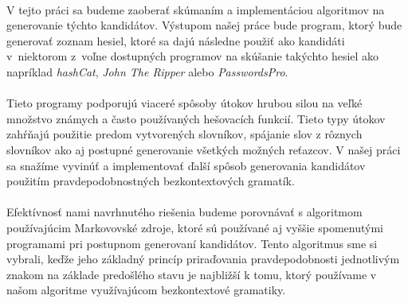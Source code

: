 \paragraph{}
V tejto práci sa budeme zaoberať skúmaním a implementáciou algoritmov na generovanie týchto kandidátov. Výstupom našej práce bude program, ktorý bude generovať zoznam hesiel, ktoré sa dajú následne použiť ako kandidáti v~niektorom z~voľne dostupných programov na skúšanie takýchto hesiel ako napríklad \emph{hashCat}, \emph{John The Ripper} alebo \emph{PasswordsPro}.

\paragraph{}
Tieto programy podporujú viaceré spôsoby útokov hrubou silou na veľké množstvo známych a často používaných hešovacích funkcií. Tieto typy útokov zahŕňajú použitie predom vytvorených slovníkov, spájanie slov z rôznych slovníkov ako aj postupné generovanie všetkých možných reťazcov. V našej práci sa snažíme vyvinúť a implementovať ďalší spôsob generovania kandidátov použitím pravdepodobnostných bezkontextových gramatík.

\paragraph{}
Efektívnosť nami navrhnutého riešenia budeme porovnávať s algoritmom používajúcim Markovovské zdroje, ktoré sú používané aj vyššie spomenutými programami pri postupnom generovaní kandidátov. Tento algoritmus sme si vybrali, keďže jeho základný princíp priraďovania pravdepodobnosti jednotlivým znakom na základe predošlého stavu je najbližší k tomu, ktorý používame v našom algoritme využívajúcom bezkontextové gramatiky.